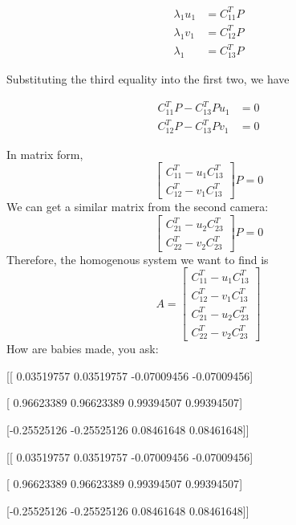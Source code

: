 \documentclass{scrbook}
\begin{document}
\begin{align*}
\lambda _{1}u_{1}&={C}_{11}^{T}P \\
\lambda _{1}v_{1}&={C}_{12}^{T}P \\
\lambda _{1}&={C}_{13}^{T}P 
\end{align*}

Substituting the third equality into the first two, we have

\begin{align*}
{C}_{11}^{T}P-{C}_{13}^{T}Pu_{1}&=0 \\
{C}_{12}^{T}P-{C}_{13}^{T}Pv_{1}&=0 
\end{align*}

In matrix form,
\begin{equation*}
\left[\begin{array}{c}
{C}_{11}^{T}-u_{1}{C}_{13}^{T}\\
{C}_{12}^{T}-v_{1}{C}_{13}^{T}
\end{array}\right]P=0
\end{equation*}
We can get a similar matrix from the second camera:
\begin{equation*}
\left[\begin{array}{c}
{C}_{21}^{T}-u_{2}{C}_{23}^{T}\\
{C}_{22}^{T}-v_{2}{C}_{23}^{T}
\end{array}\right]P=0
\end{equation*}
Therefore, the homogenous system we want to find is
\begin{equation*}
A=\left[\begin{array}{c}
{C}_{11}^{T}-u_{1}{C}_{13}^{T}\\
{C}_{12}^{T}-v_{1}{C}_{13}^{T}\\
{C}_{21}^{T}-u_{2}{C}_{23}^{T}\\
{C}_{22}^{T}-v_{2}{C}_{23}^{T}
\end{array}\right]
\end{equation*}
\pagebreak
How are babies made, you ask:

{[}{[} 0.03519757  0.03519757 -0.07009456 -0.07009456{]}

 {[} 0.96623389  0.96623389  0.99394507  0.99394507{]}

 {[}-0.25525126 -0.25525126  0.08461648  0.08461648{]}{]}

{[}{[} 0.03519757  0.03519757 -0.07009456 -0.07009456{]}

 {[} 0.96623389  0.96623389  0.99394507  0.99394507{]}

 {[}-0.25525126 -0.25525126  0.08461648  0.08461648{]}{]}
\end{document}
